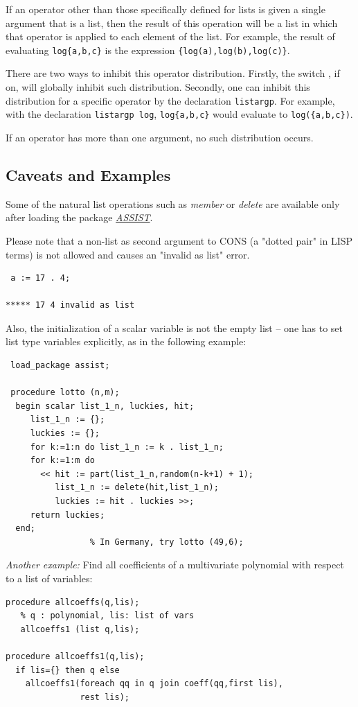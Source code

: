 If an operator other than those specifically defined for lists is given a
single argument that is a list, then the result of this operation will be
a list in which that operator is applied to each element of the list.  For
example, the result of evaluating \texttt{log\{a,b,c\}} is the expression
\texttt{\{log(a),log(b),log(c)\}}.

There are two ways to inhibit this operator distribution.  Firstly, the
switch , if on, will globally inhibit
such distribution.  Secondly, one can inhibit this distribution for a
specific operator by the declaration \texttt{listargp}. For
example, with the declaration \texttt{listargp log}, \texttt{log\{a,b,c\}}
 would evaluate to \texttt{log(\{a,b,c\})}.

If an operator has more than one argument, no such distribution occurs.

\subsection{Caveats and Examples}

Some of the natural list operations such as \textit{member} or
\textit{delete} are available only after loading the package
\textit{\hyperlink{ASSIST}{ASSIST}}.

Please note that a non-list as second argument to CONS
(a "dotted pair" in LISP terms) is not allowed
and causes an "invalid as list" error.
\begin{verbatim}
 a := 17 . 4;

***** 17 4 invalid as list
\end{verbatim}
Also, the initialization of a scalar variable is not the empty list --
one has to set list type variables explicitly, as in the following
example:
\begin{verbatim}
 load_package assist;

 procedure lotto (n,m);
  begin scalar list_1_n, luckies, hit;
     list_1_n := {};
     luckies := {};
     for k:=1:n do list_1_n := k . list_1_n;
     for k:=1:m do
       << hit := part(list_1_n,random(n-k+1) + 1);
          list_1_n := delete(hit,list_1_n);
          luckies := hit . luckies >>;
     return luckies;
  end;
                 % In Germany, try lotto (49,6);
\end{verbatim}

\textit{Another example:} Find all coefficients of a multivariate
polynomial with respect to a list of variables:

\begin{verbatim}
procedure allcoeffs(q,lis);
   % q : polynomial, lis: list of vars
   allcoeffs1 (list q,lis);

procedure allcoeffs1(q,lis);
  if lis={} then q else
    allcoeffs1(foreach qq in q join coeff(qq,first lis),
               rest lis);
\end{verbatim}
